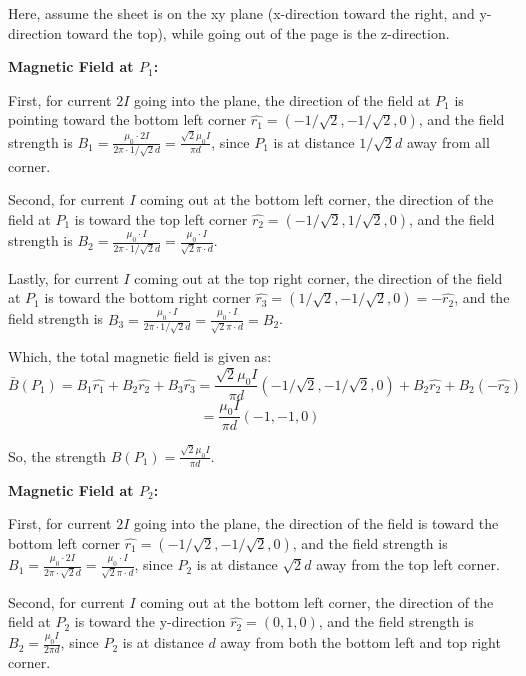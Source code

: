 \documentclass{article}
\begin{document}
Here, assume the sheet is on the xy plane (x-direction toward the right, and y-direction toward the top), while going out of the page is the z-direction.

\hfill

\textbf{Magnetic Field at $P_1$:}

First, for current $2I$ going into the plane, the direction of the field at $P_1$ is pointing toward the bottom left corner $\hat{r_1}=(-1/\sqrt{2},-1/\sqrt{2},0)$,
and the field strength is $B_1 = \frac{\mu_0\cdot 2I}{2\pi \cdot 1/\sqrt{2}d} = \frac{\sqrt{2}\mu_0 I}{\pi d}$, since $P_1$ is at distance $1/\sqrt{2}d$ away from all corner.

Second, for current $I$ coming out at the bottom left corner, the direction of the field at $P_1$ is toward the top left corner $\hat{r_2}=(-1/\sqrt{2},1/\sqrt{2},0)$,
and the field strength is $B_2 = \frac{\mu_0\cdot I}{2\pi \cdot 1/\sqrt{2}d} = \frac{\mu_0\cdot I}{\sqrt{2}\pi \cdot d}$.

Lastly, for current $I$ coming out at the top right corner, the direction of the field at $P_1$ is toward the bottom right corner $\hat{r_3}=(1/\sqrt{2},-1/\sqrt{2},0) = -\hat{r_2}$,
and the field strength is $B_3 = \frac{\mu_0\cdot I}{2\pi \cdot 1/\sqrt{2}d} = \frac{\mu_0\cdot I}{\sqrt{2}\pi \cdot d} = B_2$.

\hfill

Which, the total magnetic field is given as:
$$\bar{B}(P_1)=B_1\hat{r_1}+B_2\hat{r_2}+B_3\hat{r_3} = \frac{\sqrt{2}\mu_0 I}{\pi d}(-1/\sqrt{2},-1/\sqrt{2},0) + B_2\hat{r_2}+B_2(-\hat{r_2})$$
$$ = \frac{\mu_0 I}{\pi d}(-1,-1,0)$$

So, the strength $B(P_1) = \frac{\sqrt{2}\mu_0 I}{\pi d}$.

\hfill

\textbf{Magnetic Field at $P_2$:}

First, for current $2I$ going into the plane, the direction of the field is toward the bottom left corner $\hat{r_1}=(-1/\sqrt{2},-1/\sqrt{2},0)$,
and the field strength is $B_1 = \frac{\mu_0 \cdot 2I}{2\pi \cdot \sqrt{2}d} = \frac{\mu_0 \cdot I}{\sqrt{2}\pi \cdot d}$, since $P_2$ is at distance $\sqrt{2}d$ away from the top left corner.

Second, for current $I$ coming out at the bottom left corner, the direction of the field at $P_2$ is toward the y-direction $\hat{r_2}=(0,1,0)$,
and the field strength is $B_2 = \frac{\mu_0 I}{2\pi d}$, since $P_2$ is at distance $d$ away from both the bottom left and top right corner.
\end{document}
